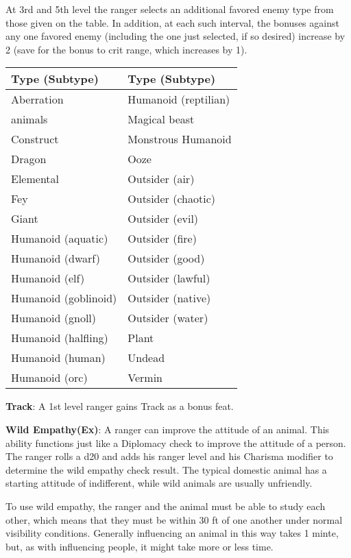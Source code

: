 At 3rd and 5th level the ranger selects an additional favored enemy type from those given on the table. In addition, at each such interval, the bonuses against any one favored enemy (including the one just selected, if so desired) increase by 2 (save for the bonus to crit range, which increases by 1).

\begin{center}
\begin{adjustwidth}{-4cm}{}
\begin{small}
\begin{tabular}{| l | l |}
\hline
Type (Subtype) &Type (Subtype) \\
\hline
Aberration &Humanoid (reptilian) \\
animals &Magical beast \\
Construct &Monstrous Humanoid \\
Dragon &Ooze \\
Elemental &Outsider (air) \\
Fey &Outsider (chaotic) \\
Giant &Outsider (evil) \\
Humanoid (aquatic) &Outsider (fire) \\
Humanoid (dwarf) &Outsider (good) \\
Humanoid (elf) &Outsider (lawful) \\
Humanoid (goblinoid) &Outsider (native) \\
Humanoid (gnoll) &Outsider (water) \\
Humanoid (halfling) &Plant \\
Humanoid (human) &Undead \\
Humanoid (orc) &Vermin \\
\hline
\end{tabular}
\end{small}
\end{adjustwidth}
\end{center}

\textbf{Track}: A 1st level ranger gains Track as a bonus feat.

\textbf{Wild Empathy(Ex)}: A ranger can improve the attitude of an animal. This ability functions just like a Diplomacy check to improve the attitude of a person. The ranger rolls a d20 and adds his ranger level and his Charisma modifier to determine the wild empathy check result. The typical domestic animal has a starting attitude of indifferent, while wild animals are usually unfriendly.

To use wild empathy, the ranger and the animal must be able to study each other, which means that they must be within 30 ft of one another under normal visibility conditions. Generally influencing an animal in this way takes 1 minte, but, as with influencing people, it might take more or less time.

